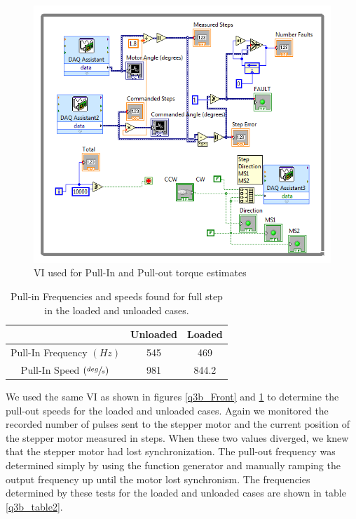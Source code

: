 \documentclass{article}
\theoremstyle{plain}
\theoremstyle{definition}
\theoremstyle{remark}
\begin{document}
\begin{figure}[htb]
\begin{center}
\includegraphics[width = 13cm]{ExternalSourceBack.png}
\caption{VI used for Pull-In and Pull-out torque estimates}
\label{q3b_Back}
\end{center}
\end{figure}

\begin{table}[htb]
\begin{center}
    \begin{tabular}{|c|c|c|}
        \hline
        ~                    & Unloaded & Loaded \\ \hline
        Pull-In Frequency $(Hz)$ & 545        & 469      \\
	Pull-In Speed $(\sfrac{deg}{s})$ & 981 & 844.2 \\
        \hline
    \end{tabular}
\caption{Pull-in Frequencies and speeds found for full step in the loaded and unloaded cases.}
\label{q3b_table1}
\end{center}
\end{table}

We used the same VI as shown in figures \ref{q3b_Front} and \ref{q3b_Back} to determine the pull-out speeds for the loaded and unloaded cases.  Again we monitored the recorded number of pulses sent to the stepper motor and the current position of the stepper motor measured in steps.   When these two values diverged, we knew that the stepper motor had lost synchronization.  The pull-out frequency was determined simply by using the function generator and manually ramping the output frequency up until the motor lost synchronism.  The frequencies determined by these tests for the loaded and unloaded cases are shown in table \ref{q3b_table2}.
\end{document}
